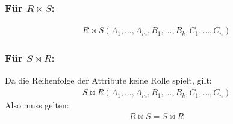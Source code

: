 \subsubsection*{Für $R\Join S$:}
\begin{align*}
  R\Join S(A_1,\dots,A_m,B_1,\dots,B_k,C_1,\dots,C_n)
\end{align*}
\subsubsection*{Für $S\Join R$:}
Da die Reihenfolge der Attribute keine Rolle spielt, gilt:
\begin{align*}
  S\Join R(A_1,\dots,A_m,B_1,\dots,B_k,C_1,\dots,C_n)
\end{align*}
Also muss gelten:
\begin{align*}
  R\Join S = S\Join R
\end{align*}

